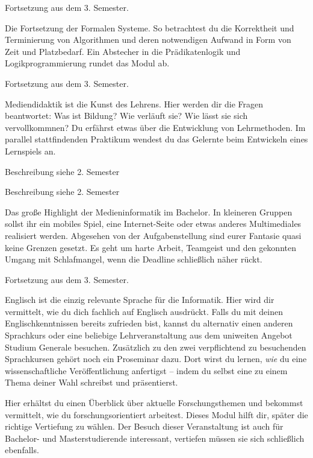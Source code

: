 Fortsetzung aus dem 3. Semester.

Die Fortsetzung der Formalen Systeme.
So betrachtest du die Korrektheit und Terminierung von Algorithmen und deren notwendigen Aufwand in Form von Zeit und Platzbedarf.
Ein Abstecher in die Prädikatenlogik und Logikprogrammierung rundet das Modul ab.

Fortsetzung aus dem 3. Semester.

Mediendidaktik ist die \glqq Kunst des Lehrens\grqq.
Hier werden dir die Fragen beantwortet:
Was ist Bildung?
Wie verläuft sie?
Wie lässt sie sich vervollkommnen?
Du erfährst etwas über die Entwicklung von Lehrmethoden.
Im parallel stattfindenden Praktikum wendest du das Gelernte beim Entwickeln eines Lernspiels an.

Beschreibung siehe 2. Semester

Beschreibung siehe 2. Semester

Das große Highlight der Medieninformatik im Bachelor.
In kleineren Gruppen sollst ihr ein mobiles Spiel, eine Internet-Seite oder etwas anderes Multimediales realisiert werden.
Abgesehen von der Aufgabenstellung sind eurer Fantasie quasi keine Grenzen gesetzt.
Es geht um harte Arbeit, Teamgeist und den gekonnten Umgang mit Schlafmangel, wenn die Deadline schließlich näher rückt.

Fortsetzung aus dem 3. Semester.

Englisch ist die einzig relevante Sprache für die Informatik.
Hier wird dir vermittelt, wie du dich fachlich auf Englisch ausdrückt.
Falls du mit deinen Englischkenntnissen bereits zufrieden bist, kannst du alternativ einen anderen Sprachkurs oder eine beliebige Lehrveranstaltung aus dem uniweiten Angebot Studium Generale besuchen.
Zusätzlich zu den zwei verpflichtend zu besuchenden Sprachkursen gehört noch ein Proseminar dazu.
Dort wirst du lernen, \textit{wie} du eine wissenschaftliche Veröffentlichung anfertigst -- indem du selbst eine zu einem Thema deiner Wahl schreibst und präsentierst.

Hier erhältst du einen Überblick über aktuelle Forschungsthemen und bekommst vermittelt, wie du forschungsorientiert arbeitest.
Dieses Modul hilft dir, später die richtige Vertiefung zu wählen. Der Besuch dieser Veranstaltung ist auch für Bachelor- und Masterstudierende interessant, vertiefen müssen sie sich schließlich ebenfalls.

